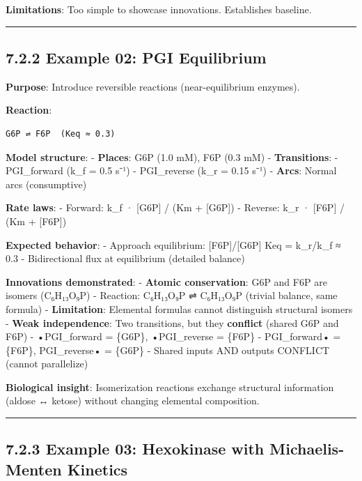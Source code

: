 \textbf{Limitations}: Too simple to showcase innovations. Establishes
baseline.

\begin{center}\rule{0.5\linewidth}{0.5pt}\end{center}

\hypertarget{example-02-pgi-equilibrium}{%
\subsection{7.2.2 Example 02: PGI
Equilibrium}\label{example-02-pgi-equilibrium}}

\textbf{Purpose}: Introduce reversible reactions (near-equilibrium
enzymes).

\textbf{Reaction}:

\begin{lstlisting}
G6P ⇌ F6P  (Keq ≈ 0.3)
\end{lstlisting}

\textbf{Model structure}: - \textbf{Places}: G6P (1.0 mM), F6P (0.3 mM)
- \textbf{Transitions}: - PGI\_forward (k\_f = 0.5 s⁻¹) - PGI\_reverse
(k\_r = 0.15 s⁻¹) - \textbf{Arcs}: Normal arcs (consumptive)

\textbf{Rate laws}: - Forward: k\_f · {[}G6P{]} / (Km + {[}G6P{]}) -
Reverse: k\_r · {[}F6P{]} / (Km + {[}F6P{]})

\textbf{Expected behavior}: - Approach equilibrium: {[}F6P{]}/{[}G6P{]}
\textrightarrow Keq = k\_r/k\_f ≈ 0.3 - Bidirectional flux at equilibrium (detailed
balance)

\textbf{Innovations demonstrated}: - \checkmark \textbf{Atomic conservation}:
G6P and F6P are isomers (C₆H₁₃O₉P) - Reaction: C₆H₁₃O₉P ⇌ C₆H₁₃O₉P
(trivial balance, same formula) - \textbf{Limitation}: Elemental
formulas cannot distinguish structural isomers - \textwarning \textbf{Weak
independence}: Two transitions, but they \textbf{conflict} (shared G6P
and F6P) - •PGI\_forward = \{G6P\}, •PGI\_reverse = \{F6P\} -
PGI\_forward• = \{F6P\}, PGI\_reverse• = \{G6P\} - Shared inputs AND
outputs \textrightarrow CONFLICT (cannot parallelize)

\textbf{Biological insight}: Isomerization reactions exchange structural
information (aldose ↔ ketose) without changing elemental composition.

\begin{center}\rule{0.5\linewidth}{0.5pt}\end{center}

\hypertarget{example-03-hexokinase-with-michaelis-menten-kinetics}{%
\subsection{7.2.3 Example 03: Hexokinase with Michaelis-Menten
Kinetics}\label{example-03-hexokinase-with-michaelis-menten-kinetics}}

